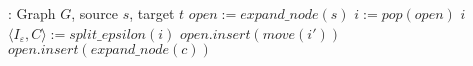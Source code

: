 \begin{algorithmic}
: Graph $G$, source $s$, target $t$
\STATE $open := expand\_node(s)$
\LOOP
  \STATE $i := pop(open)$
     $i$
  \ENDIF
  \STATE $\langle I_\varepsilon, C\rangle := split\_epsilon(i)$
    \STATE $open.insert(move(i'))$
  \ENDFOR
    \STATE $open.insert(expand\_node(c))$
  \ENDFOR
\ENDLOOP
\end{algorithmic}

